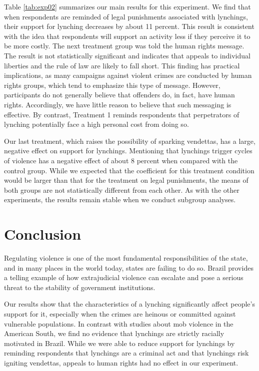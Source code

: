 \documentclass[12pt,a4paper]{article}
\begin{document}
Table \ref{tab:exp02} summarizes our main results for this experiment. We find
that when respondents are reminded of legal punishments associated with
lynchings, their support for lynching decreases by about 11 percent. This
result is consistent with the idea that respondents will support an activity
less if they perceive it to be more costly. The next treatment group was told
the human rights message. The result is not statistically significant and
indicates that appeals to individual liberties and the rule of law are likely
to fall short. This finding has practical implications, as many campaigns
against violent crimes are conducted by human rights groups, which tend to
emphasize this type of message. However, participants do not generally believe
that offenders do, in fact, have human rights. Accordingly, we have little
reason to believe that such messaging is effective. By contrast, Treatment 1
reminds respondents that perpetrators of lynching potentially face a high
personal cost from doing so.
 
Our last treatment, which raises the possibility of sparking vendettas, has a
large, negative effect on support for lynchings. Mentioning that lynchings
trigger cycles of violence has a negative effect of about 8 percent when
compared with the control group. While we expected that the coefficient for
this treatment condition would be larger than that for the treatment on legal
punishments, the means of both groups are not statistically different from each
other. As with the other experiments, the results remain stable when we conduct
subgroup analyses. 

\section*{Conclusion}
\label{conclusion}

Regulating violence is one of the most fundamental responsibilities of the
state, and in many places in the world today, states are failing to do so.
Brazil provides a telling example of how extrajudicial violence can escalate
and pose a serious threat to the stability of government institutions. 

Our results show that the characteristics of a lynching significantly affect
people's support for it, especially when the crimes are heinous or committed
against vulnerable populations. In contrast with studies about mob violence in
the American South, we find no evidence that lynchings are strictly racially
motivated in Brazil. While we were able to reduce support for lynchings by
reminding respondents that lynchings are a criminal act and that lynchings risk
igniting vendettas, appeals to human rights had no effect in our experiment. 
\end{document}
